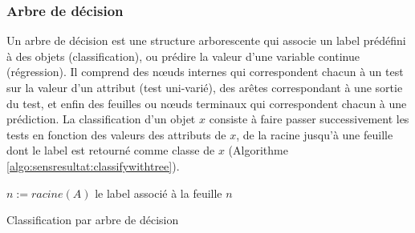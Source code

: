 \subsubsection{Arbre de décision}
Un arbre de décision est une structure arborescente qui associe un label prédéfini à des objets (classification), ou prédire la valeur d'une variable continue (régression). Il comprend des n\oe{}uds internes qui correspondent chacun à un test sur la valeur d'un attribut (test uni-varié), des arêtes correspondant à une sortie du test, et enfin des feuilles ou n\oe{}uds terminaux qui correspondent chacun à une prédiction. La classification d'un objet $x$ consiste à faire passer successivement les tests en fonction des valeurs des attributs de $x$, de la racine jusqu'à une feuille dont le label est retourné comme classe de $x$ (Algorithme \ref{algo:sensresultat:classifywithtree}).

\begin{algorithm}[ht] \small
	$n := racine(A)$ \; 
	\Return le label associé à la feuille $n$\;
	\caption{Classification par arbre de décision} \label{algo:sensresultat:classifywithtree}
\end{algorithm}

